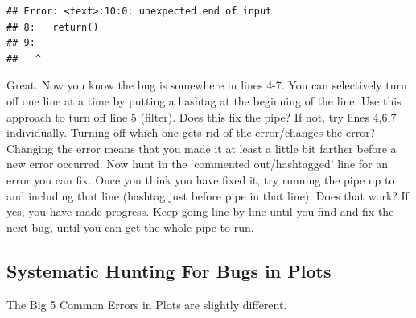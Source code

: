 \documentclass[
]{book}
\begin{document}
\begin{verbatim}
## Error: <text>:10:0: unexpected end of input
## 8:   return()
## 9:   
##   ^
\end{verbatim}

Great. Now you know the bug is somewhere in lines 4-7.
You can selectively turn off one line at a time by putting a hashtag at the beginning of the line.
Use this approach to turn off line 5 (filter).
Does this fix the pipe?
If not, try lines 4,6,7 individually. Turning off which one gets rid of the error/changes the error?
Changing the error means that you made it at least a little bit farther before a new error occurred.
Now hunt in the `commented out/hashtagged' line for an error you can fix. Once you think you have fixed it, try running the pipe up to and including that line (hashtag just before pipe in that line). Does that work?
If yes, you have made progress.
Keep going line by line until you find and fix the next bug, until you can get the whole pipe to run.

\hypertarget{systematic-hunting-for-bugs-in-plots}{%
\subsection{Systematic Hunting For Bugs in Plots}\label{systematic-hunting-for-bugs-in-plots}}

The Big 5 Common Errors in Plots are slightly different.
\end{document}
